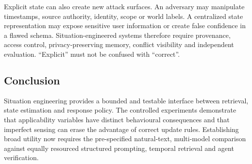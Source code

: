 Explicit state can also create new attack surfaces. An adversary may manipulate
timestamps, source authority, identity, scope or world labels. A centralized
state representation may expose sensitive user information or create false
confidence in a flawed schema. Situation-engineered systems therefore require
provenance, access control, privacy-preserving memory, conflict visibility and
independent evaluation. ``Explicit'' must not be confused with ``correct''.

\subsection*{Conclusion}

Situation engineering provides a bounded and testable interface between
retrieval, state estimation and response policy. The controlled experiments
demonstrate that applicability variables have distinct behavioural consequences
and that imperfect sensing can erase the advantage of correct update rules.
Establishing broad utility now requires the pre-specified natural-text,
multi-model comparison against equally resourced structured prompting,
temporal retrieval and agent verification.

